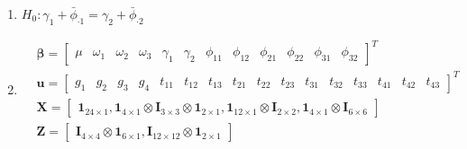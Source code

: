 \documentclass{article}
\begin{document}
\begin{enumerate}[leftmargin = 0 em, label = \arabic*., font = \bfseries]
\begin{enumerate}
		\item 
		$H_0 : \gamma_1 + \bar{\phi}_{\cdot 1} = \gamma_2 + \bar{\phi}_{\cdot 2}$


		\item 
		\begin{align*}
		& \bm \beta = \begin{bmatrix}
			\mu & \omega_1 & \omega_2 & \omega_3 & \gamma_1 & \gamma_2 & \phi_{11} & \phi_{12} & \phi_{21} & \phi_{22} & \phi_{31} & \phi_{32}
		\end{bmatrix}^T \\
		& \bm u = \begin{bmatrix}
			g_1 & g_2 & g_3 & g_4 & t_{11} & t_{12} & t_{13} & t_{21} & t_{22} & t_{23} & t_{31} & t_{32} & t_{33} & t_{41} & t_{42} & t_{43} 
		\end{bmatrix}^T\\
		& \bm X = \begin{bmatrix}
			\bm 1_{24 \times 1} ,\bm 1_{4 \times 1} \otimes 
				\bm I_{3\times 3} \otimes \bm 1_{2 \times 1} ,\bm 1_{12 \times 1} \otimes \bm I_{2 \times 2} , \bm 1_{4\times 1}\otimes \bm I_{6\times 6}
		\end{bmatrix}\\
		& \bm Z = \begin{bmatrix}
			\bm I_{4 \times 4} \otimes \bm 1_{6 \times 1} , \bm I_{12\times 12}  \otimes \bm 1_{2 \times 1}
		\end{bmatrix}
		\end{align*}
		
		
	\end{enumerate}
	

	


	     
\end{enumerate}
	      
\end{document}
